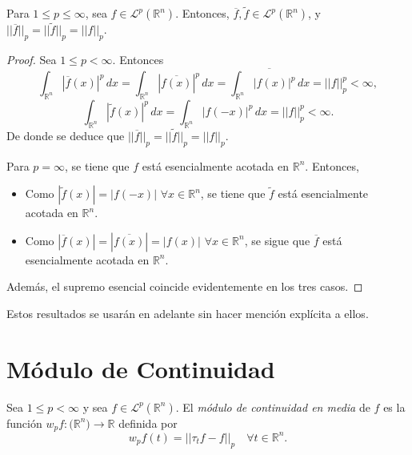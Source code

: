 \begin{proposicion} \label{prop:conj}
    Para $ 1\leq p \leq \infty$, sea $f \in \mathscr{L}^p(\mathbb{R}^n)$. Entonces,   $\overline{f},\widetilde{f} \in \mathscr{L}^p(\mathbb{R}^n) $, y $||\overline{f}||_p = ||\widetilde{f}||_p = ||f||_p$.
\end{proposicion}

\begin{proof}
Sea $ 1\leq p < \infty$. Entonces
    \begin{equation}
       \int_{\mathbb{R}^n} |\overline{f}(x)|^p  \, dx =  \int_{\mathbb{R}^n} |\overline{f(x)}|^p  \, dx = \overline{\int_{\mathbb{R}^n} |f(x)|^p  \, dx} = ||f||_p^p< \infty,
    \end{equation}
    \begin{equation}
        \int_{\mathbb{R}^n} |\widetilde{f}(x)|^p  \, dx = \int_{\mathbb{R}^n} |f(-x)|^p  \, dx= ||f||_p^p< \infty.
    \end{equation}
De donde se deduce que $||\overline{f}||_p = ||\widetilde{f}||_p = ||f||_p$.
\vspace{0.2cm}

\noindent Para $p= \infty$, se tiene que $f$ está esencialmente acotada en $\mathbb{R}^n$. Entonces, 
\begin{itemize}
    \item   Como $|\widetilde{f}(x)| = |f(-x)| \,\, \forall x \in \mathbb{R}^n$, se tiene que $\widetilde{f}$ está esencialmente acotada en $\mathbb{R}^n$.
    \item Como $|\overline{f}(x)| = |\overline{f(x)}|= |f(x)|  \,\, \forall x \in \mathbb{R}^n$, se sigue que $\overline{f}$ está esencialmente acotada en $\mathbb{R}^n$.
\end{itemize} 
Además, el supremo esencial coincide evidentemente en los tres casos.
\end{proof}

\noindent Estos resultados se usarán en adelante sin hacer mención explícita a ellos. 

\section{Módulo de Continuidad}
\begin{definicion}
Sea $1\leq p < \infty$ y sea $f \in \mathscr{L}^p(\mathbb{R}^n)$. El \textit{módulo de continuidad en media} de $f$ es la función $w_pf: \mathbb(\mathbb{R}^n) \rightarrow \mathbb{R}$ definida por 
\begin{equation}
    w_pf(t) =||\tau_tf-f||_p  \quad \forall t \in \mathbb{R}^n.
\end{equation}
\end{definicion}

